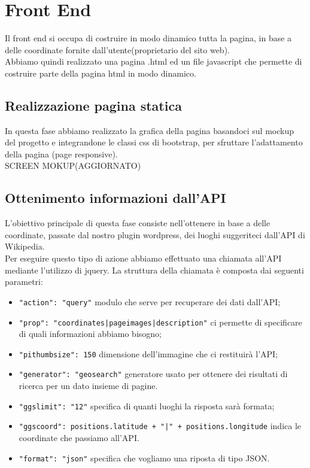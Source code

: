 \section*{Front End}
Il front end si occupa di costruire in modo dinamico tutta la pagina, in base a delle coordinate fornite dall'utente(proprietario del sito web).\\
Abbiamo quindi realizzato una pagina .html ed un file javascript che permette di costruire parte della pagina html in modo dinamico.
\subsection*{Realizzazione pagina statica}
In questa fase abbiamo realizzato la grafica della pagina basandoci sul mockup del progetto e integrandone le classi css di bootstrap, per sfruttare 
l'adattamento della pagina (page responsive).\\ 
SCREEN MOKUP(AGGIORNATO)
\subsection*{Ottenimento informazioni dall'API} 
L'obiettivo principale di questa fase consiste nell'ottenere in base a delle coordinate, passate dal nostro plugin wordpress, dei luoghi suggeriteci dall'API di Wikipedia.\\
Per eseguire questo tipo di azione abbiamo effettuato una chiamata all'API mediante l'utilizzo di jquery.
La struttura della chiamata è composta dai seguenti parametri:
\begin{itemize}
\item \texttt{"action": "query"} modulo che serve per recuperare dei dati dall'API;
\item \texttt{"prop": "coordinates|pageimages|description"} ci permette di specificare di quali informazioni abbiamo bisogno;
\item \texttt{"pithumbsize": 150} dimensione dell'immagine che ci restituirà l'API;
\item \texttt{"generator": "geosearch"} generatore usato per ottenere dei risultati di ricerca per un dato insieme di pagine.
\item \texttt{"ggslimit": "12"} specifica di quanti luoghi la risposta sarà formata;
\item \texttt{"ggscoord":  positions.latitude + "|" + positions.longitude} indica le coordinate che passiamo all'API.
\item \texttt{"format": "json"} specifica che vogliamo una riposta di tipo JSON.
\end{itemize}
